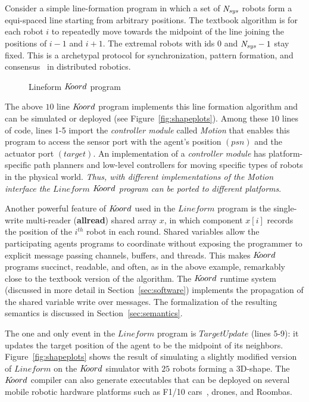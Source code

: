 Consider a simple line-formation program in which a set of $\mathit{N_{sys}}$ robots form a equi-spaced line starting from arbitrary positions. The textbook algorithm is for each robot $i$ to repeatedly move towards the midpoint of the line joining the positions of $i-1$ and $i+1$. The extremal robots with ids $0$ and $\mathit{N_{sys}} -1$ stay fixed. This is a archetypal protocol for synchronization, pattern formation, and consensus~\cite{Tsitsiklis:1986,Blondel,Magnusbook2010,Fax} in distributed robotics.
%
\begin{figure}
\begin{mdframed}
\label{fig:lineform}
        {}
\end{mdframed}
\caption{Lineform $K\kern-2pt oord$ program}

\end{figure}
The above $10$ line  $K\kern-2pt oord$ program implements this line formation algorithm and can be simulated or deployed (see Figure~\ref{fig:shapeplots}). Among these $10$ lines of code, lines 1-5 import the {\em controller module\/} called {\em Motion\/} that enables this program to access the sensor port with the agent's position $(\mathit{psn})$ and the actuator port $(\mathit{target})$. An implementation of  a {\em controller module\/} has platform-specific path planners and low-level controllers for moving specific types of robots in the physical world. {\em Thus, with different implementations of the {\em Motion\/} interface the $\mathit{Lineform}$ $K\kern-2pt oord$  program can be ported to different platforms\/}. 

Another powerful feature of $K\kern-2pt oord$ used in the $\mathit{Lineform}$ program is the single-write multi-reader ({\bf allread}) shared array $x$, in which component $x[i]$ records the position of the $i^{th}$ robot in each round.  Shared variables allow the participating agents programs to coordinate without exposing the programmer to explicit message passing channels, buffers, and threads. This makes $K\kern-2pt oord$ programs succinct, readable, and often, as in the  above example, remarkably close to the textbook version of the algorithm. The $K\kern-2pt oord$ runtime system (discussed in more detail in Section~\ref{sec:software}) implements the propagation of  the shared variable write over messages. The formalization of the resulting semantics is discussed in Section~\ref{sec:semantics}.

%
The one and only event in the $\mathit{Lineform}$ program is $\mathit{TargetUpdate}$ (lines 5-9): it updates the target position of the agent  to be the midpoint of its neighbors.  Figure~\ref{fig:shapeplots} shows the result of simulating a slightly modified version of $\mathit{Lineform}$ on the $K\kern-2pt oord$ simulator with $25$ robots forming a 3D-shape. The $K\kern-2pt oord$ compiler can also generate executables that can be deployed on several mobile robotic hardware platforms such as F1/10 cars~\cite{f110}, drones, and Roombas. 
 
